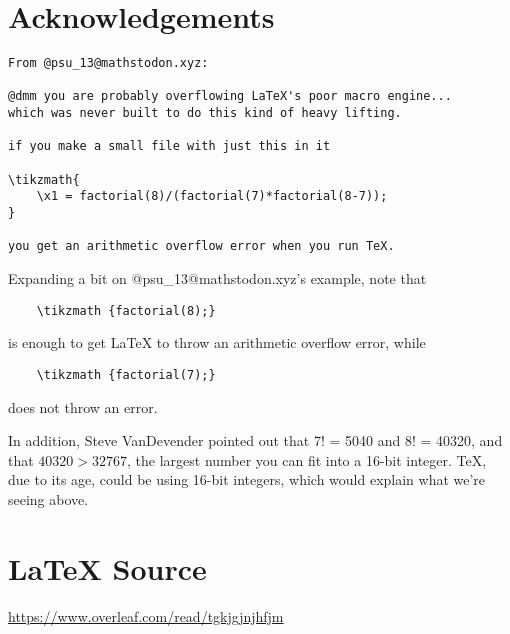 \documentclass{article}
\theoremstyle{definition}
\begin{document}
\section{Acknowledgements}
\label{sec:acknowledgements}

\begin{verbatim}
From @psu_13@mathstodon.xyz: 

@dmm you are probably overflowing LaTeX's poor macro engine... 
which was never built to do this kind of heavy lifting.

if you make a small file with just this in it

\tikzmath{
    \x1 = factorial(8)/(factorial(7)*factorial(8-7));
}

you get an arithmetic overflow error when you run TeX.
\end{verbatim}

\bigskip
\noindent
Expanding a bit on @psu\_13@mathstodon.xyz's example, 
note that 

\begin{verbatim}
    \tikzmath {factorial(8);} 
\end{verbatim}

\noindent
is enough to get LaTeX to throw an arithmetic overflow error,
while 

\begin{verbatim}
    \tikzmath {factorial(7);} 
\end{verbatim}

\noindent
does not throw an error.

\bigskip
\noindent
In addition, Steve VanDevender pointed out that 7! = 5040 and 
8! = 40320, and that $40320 > 32767$, the largest number you 
can fit into a 16-bit integer. TeX, due to its age, could 
be using 16-bit integers, which would explain what we're
seeing above.
%
%
\section*{\LaTeX \hspace{0.025 mm} Source}
\url{https://www.overleaf.com/read/tgkjgjnjhfjm}
%
%
%
% 
% 
%
%
\end{document}
